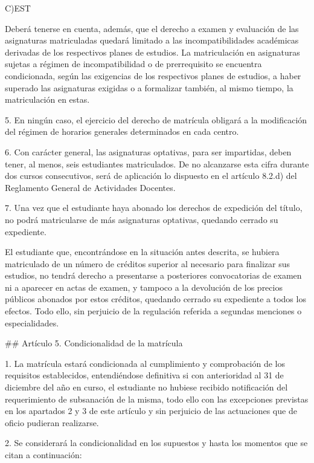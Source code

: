 \documentclass{article}
\begin{document}
\begin{itemize}
\begin{itemize}
\begin{scriptsize}
                  C)EST

                  Deberá tenerse en cuenta, además, que el derecho a examen y evaluación de las asignaturas matriculadas quedará limitado a las incompatibilidades académicas derivadas de los respectivos planes de estudios. La matriculación en asignaturas sujetas a régimen de incompatibilidad o de prerrequisito se encuentra condicionada, según las exigencias de los respectivos planes de estudios, a haber superado las asignaturas exigidas o a formalizar también, al mismo tiempo, la matriculación en estas.

                  5. En ningún caso, el ejercicio del derecho de matrícula obligará a la modificación del régimen de horarios generales determinados en cada centro.

                  6. Con carácter general, las asignaturas optativas, para ser impartidas, deben tener, al menos, seis estudiantes matriculados. De no alcanzarse esta cifra durante dos cursos consecutivos, será de aplicación lo dispuesto en el artículo 8.2.d) del Reglamento General de Actividades Docentes.

                  7. Una vez que el estudiante haya abonado los derechos de expedición del título, no podrá matricularse de más asignaturas optativas, quedando cerrado su expediente.

                  El estudiante que, encontrándose en la situación antes descrita, se hubiera matriculado de un número de créditos superior al necesario para finalizar sus estudios, no tendrá derecho a presentarse a posteriores convocatorias de examen ni a aparecer en actas de examen, y tampoco a la devolución de los precios públicos abonados por estos créditos, quedando cerrado su expediente a todos los efectos. Todo ello, sin perjuicio de la regulación referida a segundas menciones o especialidades.

                  \#\# Artículo 5. Condicionalidad de la matrícula

                  1. La matrícula estará condicionada al cumplimiento y comprobación de los requisitos establecidos, entendiéndose definitiva si con anterioridad al 31 de diciembre del año en curso, el estudiante no hubiese recibido notificación del requerimiento de subsanación de la misma, todo ello con las excepciones previstas en los apartados 2 y 3 de este artículo y sin perjuicio de las actuaciones que de oficio pudieran realizarse.

                  2. Se considerará la condicionalidad en los supuestos y hasta los momentos que se citan a continuación:


\end{scriptsize}
\end{itemize}
\end{itemize}
\end{document}
